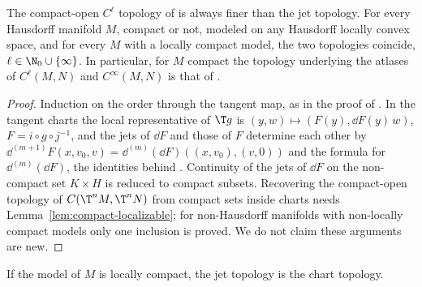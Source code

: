 \begin{theorem}
  \label{thm:jet-topology-gn}
  \leanok
  The compact-open $C^\ell$ topology of \cite[Def.~4.1.2]{GN26} is always finer than the jet
  topology. For every Hausdorff manifold $M$, compact or not, modeled on any Hausdorff locally
  convex space, and for every $M$ with a locally compact model, the two topologies coincide,
  $\ell \in \N_0 \cup \{\infty\}$. In particular, for $M$ compact the topology underlying the
  atlases of $C^\ell(M, N)$ and $C^\infty(M, N)$ is that of \cite[Def.~4.1.2]{GN26}
  \cite[Thm.~4.2.2(b)]{GN26}.
\end{theorem}

\begin{proof}
  \leanok
  Induction on the order through the tangent map, as in the proof of \cite[Lemma~4.1.6]{GN26}. In
  the tangent charts the local representative of $\T g$ is $(y, w) \mapsto (F(y), \dd F(y)\,w)$,
  $F = i \circ g \circ j^{-1}$, and the jets of $\dd F$ and those of $F$ determine each other by
  $\dd^{(m+1)}F(x, v_0, v) = \dd^{(m)}(\dd F)((x, v_0), (v, 0))$ \cite[(1.36)]{GN26} and the formula
  for $\dd^{(m)}(\dd F)$, the identities behind \cite[Lemma~4.1.12]{GN26}. Continuity of the jets
  of $\dd F$ on the non-compact set $K \times H$ is reduced to compact subsets. Recovering the
  compact-open topology of $C(\T^n M, \T^n N)$ from compact sets inside charts needs
  Lemma~\ref{lem:compact-localizable}; for non-Hausdorff manifolds with non-locally compact models
  only one inclusion is proved. We do not claim these arguments are new.
\end{proof}

\begin{corollary}
  \label{cor:jet-topology-chart}
  \leanok
  If the model of $M$ is locally compact, the jet topology is the chart topology.
\end{corollary}

